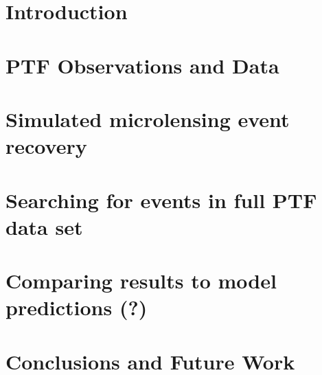 \documentclass[12pt,preprint]{aastex}
\begin{document}
\section{Introduction}

\section{PTF Observations and Data}

\section{Simulated microlensing event recovery}

\section{Searching for events in full PTF data set}

\section{Comparing results to model predictions (?)}

\section{Conclusions and Future Work}


%
%
%
%
%
%
\end{document}
